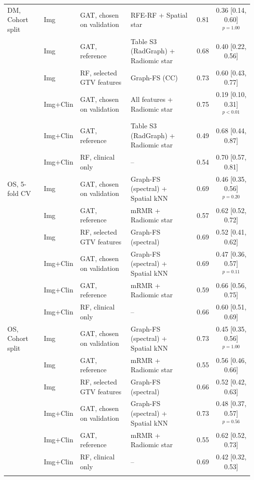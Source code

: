\begin{tabular}{@{}llllcc@{}}
\addlinespace
DM, Cohort split & Img & GAT, chosen on validation & RFE-RF + Spatial star & 0.81 & 0.36 [0.14, 0.60]$^{p=1.00}$ \\
 & Img & GAT, reference & Table S3 (RadGraph) + Radiomic star & 0.68 & 0.40 [0.22, 0.56] \\
 & Img & RF, selected GTV features & Graph-FS (CC) & 0.73 & 0.60 [0.43, 0.77] \\
 & Img+Clin & GAT, chosen on validation & All features + Radiomic star & 0.75 & 0.19 [0.10, 0.31]$^{p<0.01}$ \\
 & Img+Clin & GAT, reference & Table S3 (RadGraph) + Radiomic star & 0.49 & 0.68 [0.44, 0.87] \\
 & Img+Clin & RF, clinical only & -- & 0.54 & 0.70 [0.57, 0.81] \\
\midrule
OS, 5-fold CV & Img & GAT, chosen on validation & Graph-FS (spectral) + Spatial kNN & 0.69 & 0.46 [0.35, 0.56]$^{p=0.20}$ \\
 & Img & GAT, reference & mRMR + Radiomic star & 0.57 & 0.62 [0.52, 0.72] \\
 & Img & RF, selected GTV features & Graph-FS (spectral) & 0.69 & 0.52 [0.41, 0.62] \\
 & Img+Clin & GAT, chosen on validation & Graph-FS (spectral) + Spatial kNN & 0.69 & 0.47 [0.36, 0.57]$^{p=0.11}$ \\
 & Img+Clin & GAT, reference & mRMR + Radiomic star & 0.59 & 0.66 [0.56, 0.75] \\
 & Img+Clin & RF, clinical only & -- & 0.66 & 0.60 [0.51, 0.69] \\
\addlinespace
OS, Cohort split & Img & GAT, chosen on validation & Graph-FS (spectral) + Spatial kNN & 0.73 & 0.45 [0.35, 0.56]$^{p=1.00}$ \\
 & Img & GAT, reference & mRMR + Radiomic star & 0.55 & 0.56 [0.46, 0.66] \\
 & Img & RF, selected GTV features & Graph-FS (spectral) & 0.66 & 0.52 [0.42, 0.63] \\
 & Img+Clin & GAT, chosen on validation & Graph-FS (spectral) + Spatial kNN & 0.73 & 0.48 [0.37, 0.57]$^{p=0.56}$ \\
 & Img+Clin & GAT, reference & mRMR + Radiomic star & 0.55 & 0.62 [0.52, 0.73] \\
 & Img+Clin & RF, clinical only & -- & 0.69 & 0.42 [0.32, 0.53] \\
\botrule
\end{tabular}
